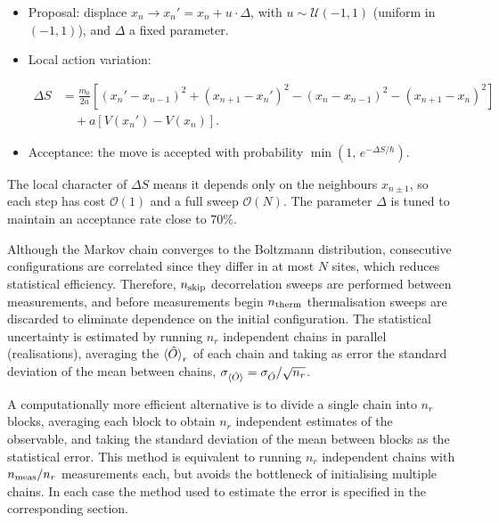 \documentclass[11pt,a4paper,twoside,pdf]{article}
\numberwithin{equation}{section}
\begin{document}
\begin{itemize}
    \item Proposal: displace $x_n \to x_n' = x_n + u\cdot \Delta$, with $u \sim \mathcal{U}(-1, 1)$ (uniform in $(-1, 1)$), and $\Delta$ a fixed parameter.

    \item Local action variation:

    \begin{equation}
    \begin{split}
        \Delta S &= \frac{m_0}{2a} \left[ (x_n' - x_{n-1})^2 + (x_{n+1} - x_n')^2 - (x_n - x_{n-1})^2 - (x_{n+1} - x_n)^2 \right] \\
                 &\quad + a \left[ V(x_n') - V(x_n) \right].
    \end{split}
    \label{deltaS}
    \end{equation}

    \item Acceptance: the move is accepted with probability $\min(1,\, e^{-\Delta S/\hbar})$.
\end{itemize}


The local character of $\Delta S$ means it depends only on the neighbours $x_{n\pm 1}$, so each step has cost $\mathcal{O}(1)$ and a full sweep $\mathcal{O}(N)$. The parameter $\Delta$ is tuned to maintain an acceptance rate close to $70\%$. \medskip


Although the Markov chain converges to the Boltzmann distribution, consecutive configurations are correlated since they differ in at most $N$ sites, which reduces statistical efficiency. Therefore, $n_{\rm skip}$ decorrelation sweeps are performed between measurements, and before measurements begin $n_{\rm therm}$ thermalisation sweeps are discarded to eliminate dependence on the initial configuration. The statistical uncertainty is estimated by running $n_r$ independent chains in parallel (realisations), averaging the $\braket{\hat{O}}_{r}$ of each chain and taking as error the standard deviation of the mean between chains, $\sigma_{\braket{\hat{O}}} = \sigma_{\hat{O}}/\sqrt{n_r}$.

A computationally more efficient alternative is to divide a single chain into $n_r$ blocks, averaging each block to obtain $n_r$ independent estimates of the observable, and taking the standard deviation of the mean between blocks as the statistical error. This method is equivalent to running $n_r$ independent chains with $n_{\rm meas}/n_r$ measurements each, but avoids the bottleneck of initialising multiple chains. In each case the method used to estimate the error is specified in the corresponding section.
\end{document}
